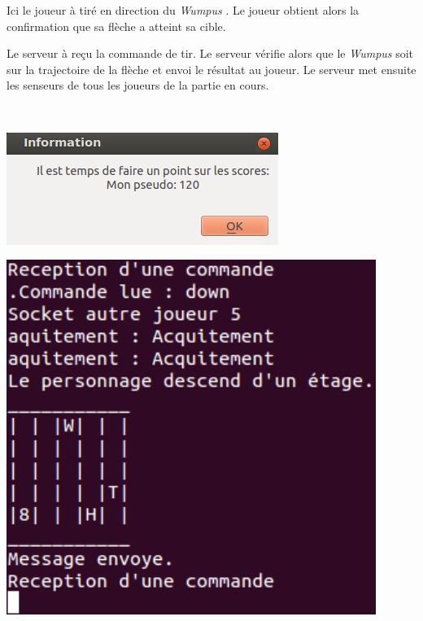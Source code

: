 \documentclass[a4paper,10pt]{article}
\newcommand{\gameName}{\emph{Wumpus }}
\begin{document}
		\begin{minipage}[t]{0.46\textwidth}
			\vspace{2pt}
			Ici le joueur à tiré en direction du \gameName. Le joueur obtient alors la confirmation que sa flèche a atteint sa cible.
		\end{minipage}
		\hfill
		\begin{minipage}[t]{0.46\textwidth}
			\vspace{2pt}
			Le serveur à reçu la commande de tir. Le serveur vérifie alors que le \gameName soit sur la trajectoire de la flèche et envoi le résultat au
joueur. Le serveur met ensuite les senseurs de tous les joueurs de la partie en cours.
		\end{minipage}\\


		\begin{minipage}[t]{0.46\textwidth}
			\vspace{50pt}
			\centering
			\includegraphics[width=.96\textwidth]{JeuxDEssais/Wumpus7.png}
		\end{minipage}
		\hfill
		\begin{minipage}[t]{0.46\textwidth}
			\vspace{2pt}
			\centering
			\includegraphics[width=0.9\textwidth]{JeuxDEssais/Serveur7.png}
		\end{minipage}
\end{document}
